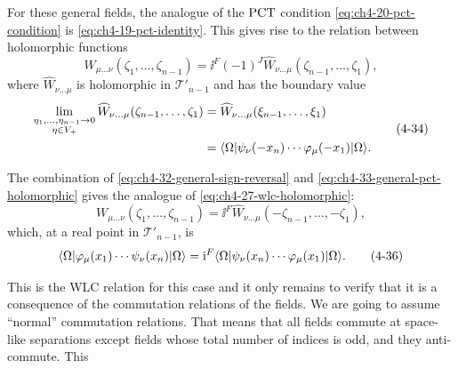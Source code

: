For these general fields, the analogue of the $\mathrm{PCT}$ condition \eqref{eq:ch4-20-pct-condition} is
\eqref{eq:ch4-19-pct-identity}. This gives rise to the relation between holomorphic functions
\begin{equation}
  W_{\mu\ldots\nu}(\zeta_1,\ldots,\zeta_{n-1})
  =\ii^F(-1)^J\widehat{W}_{\nu\ldots\mu}
  (\zeta_{n-1},\ldots,\zeta_1),
  \tag{4-33}\label{eq:ch4-33-general-pct-holomorphic}
\end{equation}
where $\widehat{W}_{\nu\ldots\mu}$ is holomorphic in $\mathcal{T}'_{n-1}$
and has the boundary value
\begin{equation}
\begin{aligned}
  \lim_{\substack{\eta_1,\ldots,\eta_{n-1}\to0\\
                   \eta\in V_+}}
  \widehat{W}_{\nu\ldots\mu}(\zeta_{n-1},\ldots,\zeta_1)
  &=\widehat{W}_{\nu\ldots\mu}(\xi_{n-1},\ldots,\xi_1) \\
  &=\langle \Omega\rvert\psi_\nu(-x_n)\cdots
    \varphi_\mu(-x_1)\lvert \Omega\rangle.
\end{aligned}
\tag{4-34}\label{eq:ch4-34-general-pct-boundary}
\end{equation}

The combination of \eqref{eq:ch4-32-general-sign-reversal} and \eqref{eq:ch4-33-general-pct-holomorphic} gives the analogue of \eqref{eq:ch4-27-wlc-holomorphic}:
\begin{equation}
  W_{\mu\ldots\nu}(\zeta_1,\ldots,\zeta_{n-1})
  =\ii^F\widehat{W}_{\nu\ldots\mu}
  (-\zeta_{n-1},\ldots,-\zeta_1),
  \tag{4-35}\label{eq:ch4-35-general-wlc-holomorphic}
\end{equation}
which, at a real point in $\mathcal{T}'_{n-1}$, is
\begin{equation}
  \langle \Omega\rvert\varphi_\mu(x_1)\cdots\psi_\nu(x_n)\lvert \Omega\rangle
  =\mathrm{i}^F\langle \Omega\rvert\psi_\nu(x_n)\cdots
  \varphi_\mu(x_1)\lvert \Omega\rangle.
  \tag{4-36}\label{eq:ch4-36-general-wlc}
\end{equation}

This is the WLC relation for this case and it only remains to verify that it
is a consequence of the commutation relations of the fields. We are going to
assume ``normal'' commutation relations. That means that all fields commute at
space-like separations except fields whose total number of indices is odd, and
they anti-commute. This
